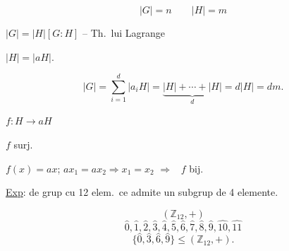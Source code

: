 \[
|G|=n \qquad |H|=m
\]

\noindent $|G| = |H|[G:H]$ -- Th.\ lui Lagrange

\noindent $|H|=|aH|$.

\[
|G| = \sum_{i=1}^{d} |a_iH| = \underbrace{|H|+\cdots+|H|}_{d} = d|H| = dm.
\]

\noindent $f : H \to aH$

\noindent $f$ surj.

\noindent $f(x)=ax$; \quad $ax_1=ax_2 \Rightarrow x_1=x_2$ \quad $\Rightarrow$ \ $f$ bij.

\bigskip
\noindent\underline{Exp}: de grup cu 12 elem.\ ce admite un subgrup de 4 elemente.

\[
(\mathbb{Z}_{12},+)
\]
\[
\hat 0,\hat 1,\hat 2,\hat 3,\hat 4,\hat 5,\hat 6,\hat 7,\hat 8,\hat 9,\hat{10},\hat{11}
\]
\[
\{\hat 0,\hat 3,\hat 6,\hat 9\} \leq (\mathbb{Z}_{12},+).
\]

